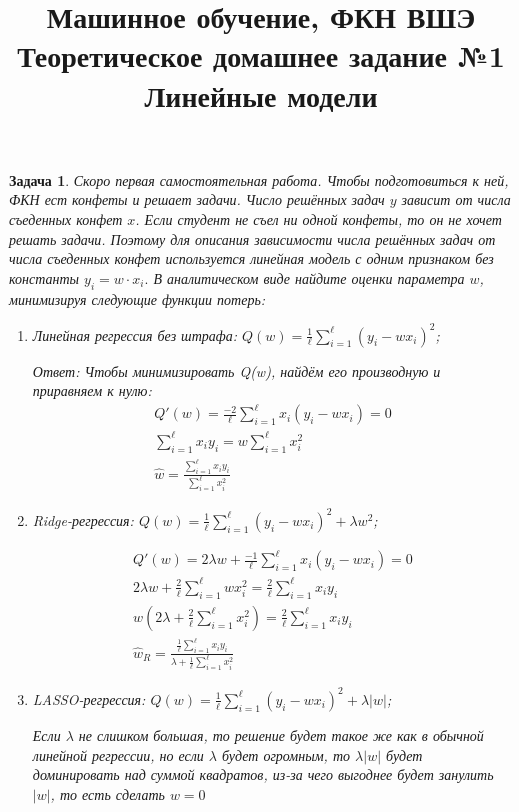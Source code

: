 \documentclass[12pt,fleqn]{article}
\title{Машинное обучение, ФКН ВШЭ \\Теоретическое домашнее задание №1 \\Линейные модели}
\author{}
\date{}
\newtheorem{esProblem}{Задача}
\begin{document}
\maketitle

\begin{esProblem}
Скоро первая самостоятельная работа. Чтобы подготовиться к ней, ФКН ест конфеты и решает задачи. Число решённых задач $y$ зависит от числа съеденных конфет $x$. Если студент не съел ни одной конфеты, то он не хочет решать задачи. Поэтому для описания зависимости числа решённых задач от числа съеденных конфет используется линейная модель с одним признаком без константы $y_i = w \cdot x_i.$ В аналитическом виде найдите оценки параметра $w$, минимизируя следующие функции потерь:

\begin{enumerate}
    \item Линейная регрессия без штрафа: $Q(w) = \frac{1}{\ell} \sum_{i=1}^{\ell} (y_i - w x_i)^2$;
    
    Ответ: Чтобы минимизировать Q(w), найдём его производную и приравняем к нулю:
        \begin{gather*}
    Q'(w) = \frac{-2}{\ell} \sum_{i=1}^{\ell} x_i(y_i - wx_i) = 0 \\
    \sum_{i=1}^{\ell} x_i y_i = w \sum_{i=1}^{\ell} x_i^2 \\
    \hat{w} = \frac{\sum_{i=1}^{\ell} x_i y_i}{\sum_{i=1}^{\ell} x_i^2}
         \end{gather*}
    
    \item Ridge-регрессия: $Q(w) = \frac{1}{\ell} \sum_{i=1}^{\ell} (y_i - w x_i)^2 + \lambda w^2$;
    
    \begin{gather*}
    Q'(w) = 2\lambda w + \frac{-1}{\ell} \sum_{i=1}^\ell x_i(y_i-wx_i) = 0 \\
    2\lambda w + \frac{2}{\ell} \sum_{i=1}^\ell w x_i^2 = \frac{2}{\ell} \sum_{i=1}^\ell x_i y_i \\
    w (2\lambda + \frac{2}{\ell}  \sum_{i=1}^\ell x_i^2) = \frac{2}{\ell} \sum_{i=1}^\ell x_i y_i \\
    \hat{w}_R = \frac{\frac{1}{\ell} \sum_{i=1}^\ell x_i y_i}{\lambda + \frac{1}{\ell} \sum_{i=1}^\ell x_i^2}
     \end{gather*}
    \item LASSO-регрессия: $Q(w) = \frac{1}{\ell} \sum_{i=1}^{\ell} (y_i - w x_i)^2 + \lambda |w|$;
    
    Если $\lambda$ не слишком большая, то решение будет такое же как в обычной линейной регрессии, но если $\lambda$ будет огромным, то $\lambda |w|$ будет доминировать над суммой квадратов, из-за чего выгоднее будет занулить $|w|$, то есть сделать $w=0$
    

\end{enumerate}
\end{esProblem}
\end{document}
